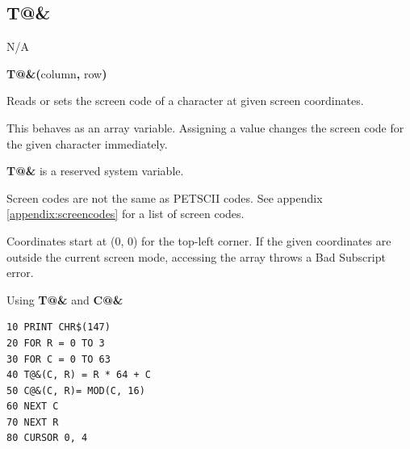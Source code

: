 \subsection{T@\&}
\begin{description}[leftmargin=2cm,style=nextline]
\item [Token:]    N/A

\item [Format:]   {\bf T@\&(}column{\bf ,} row{\bf)}

\item [Usage:]    Reads or sets the screen code of a character at given screen coordinates.

                  This behaves as an array variable. Assigning a value changes the screen code for the given character immediately.

\item[Remarks:]   {\bf T@\&} is a reserved system variable.

                  Screen codes are not the same as PETSCII codes. See appendix \vref{appendix:screencodes} for a list of screen codes.

                  Coordinates start at (0, 0) for the top-left corner. If the given coordinates are outside the current screen mode, accessing the array throws a Bad Subscript error.

\item [Example:]  Using {\bf T@\&} and {\bf C@\&}

\begin{tcolorbox}[colback=black,coltext=white]
\verbatimfont{\codefont}
\begin{verbatim}
10 PRINT CHR$(147)
20 FOR R = 0 TO 3
30 FOR C = 0 TO 63
40 T@&(C, R) = R * 64 + C
50 C@&(C, R)= MOD(C, 16)
60 NEXT C
70 NEXT R
80 CURSOR 0, 4
\end{verbatim}
\end{tcolorbox}
\end{description}


\newpage
